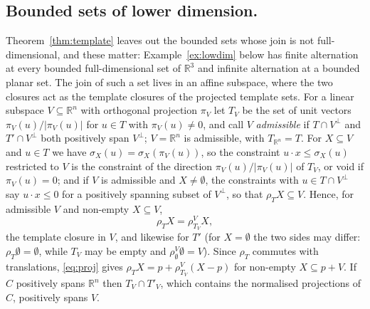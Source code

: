 \documentclass[11pt]{amsart}
\theoremstyle{definition}
\begin{document}
\subsection*{Bounded sets of lower dimension.}
Theorem~\ref{thm:template} leaves out the bounded sets whose join is
not full-dimensional, and these matter: Example~\ref{ex:lowdim} below
has finite alternation at every bounded full-dimensional set of
$\mathbb R^3$ and infinite alternation at a bounded planar set. The
join of such a set lives in an affine subspace, where the two closures
act as the template closures of the projected template sets. For a
linear subspace $V\subseteq\mathbb R^n$ with orthogonal projection
$\pi_V$ let $T_V$ be the set of unit vectors $\pi_V(u)/|\pi_V(u)|$ for
$u\in T$ with $\pi_V(u)\ne0$, and call $V$ \emph{admissible} if
$T\cap V^\perp$ and $T'\cap V^\perp$ both positively span $V^\perp$;
$V=\mathbb R^n$ is admissible, with $T_{\mathbb R^n}=T$. For $X
\subseteq V$ and $u\in T$ we have $\sigma_X(u)=\sigma_X(\pi_V(u))$, so
the constraint $u\cdot x\le\sigma_X(u)$ restricted to $V$ is the
constraint of the direction $\pi_V(u)/|\pi_V(u)|$ of $T_V$, or void if
$\pi_V(u)=0$; and if $V$ is admissible and $X\ne\emptyset$, the constraints with
$u\in T\cap V^\perp$ say $u\cdot x\le0$ for a positively spanning subset
of $V^\perp$, so that $\rho_TX\subseteq V$. Hence, for admissible $V$
and non-empty $X\subseteq V$,
\begin{equation}\label{eq:proj}
\rho_TX=\rho^V_{T_V}X,
\end{equation}
the template closure in $V$, and likewise for $T'$ (for $X=\emptyset$
the two sides may differ: $\rho_T\emptyset=\emptyset$, while $T_V$ may
be empty and $\rho^V_\emptyset\emptyset=V$). Since $\rho_T$ commutes
with translations, \eqref{eq:proj} gives $\rho_TX=p+\rho^V_{T_V}(X-p)$
for non-empty $X\subseteq p+V$. If $C$ positively
spans $\mathbb R^n$ then $T_V\cap T'_V$, which contains the normalised
projections of $C$, positively spans $V$.
\end{document}
